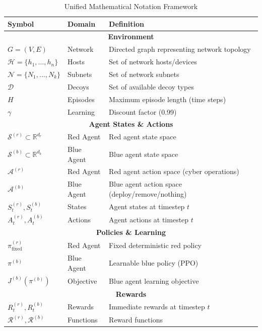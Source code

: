\documentclass[12pt,oneside]{article}
\begin{document}
\begin{table}[h]
\centering
\caption{Unified Mathematical Notation Framework}
\label{tab:unified_notation}
\small
\begin{tabular}{|l|l|p{6cm}|}
\hline
\textbf{Symbol} & \textbf{Domain} & \textbf{Definition} \\
\hline
\multicolumn{3}{|c|}{\textbf{Environment}} \\
\hline
$G = (V, E)$ & Network & Directed graph representing network topology \\
$\mathcal{H} = \{h_1, \ldots, h_n\}$ & Hosts & Set of network hosts/devices \\
$\mathcal{N} = \{N_1, \ldots, N_k\}$ & Subnets & Set of network subnets \\
$\mathcal{D}$ & Decoys & Set of available decoy types \\
$H$ & Episodes & Maximum episode length (time steps) \\
$\gamma$ & Learning & Discount factor (0.99) \\
\hline
\multicolumn{3}{|c|}{\textbf{Agent States \& Actions}} \\
\hline
$\mathcal{S}^{(r)} \subset \mathbb{R}^{d_r}$ & Red Agent & Red agent state space \\
$\mathcal{S}^{(b)} \subset \mathbb{R}^{d_b}$ & Blue Agent & Blue agent state space \\
$\mathcal{A}^{(r)}$ & Red Agent & Red agent action space (cyber operations) \\
$\mathcal{A}^{(b)}$ & Blue Agent & Blue agent action space (deploy/remove/nothing) \\
$S_t^{(r)}, S_t^{(b)}$ & States & Agent states at timestep $t$ \\
$A_t^{(r)}, A_t^{(b)}$ & Actions & Agent actions at timestep $t$ \\
\hline
\multicolumn{3}{|c|}{\textbf{Policies \& Learning}} \\
\hline
$\pi^{(r)}_{\text{fixed}}$ & Red Agent & Fixed deterministic red policy \\
$\pi^{(b)}$ & Blue Agent & Learnable blue policy (PPO) \\
$J^{(b)}(\pi^{(b)})$ & Objective & Blue agent learning objective \\
\hline
\multicolumn{3}{|c|}{\textbf{Rewards}} \\
\hline
$R_t^{(r)}, R_t^{(b)}$ & Rewards & Immediate rewards at timestep $t$ \\
$\mathcal{R}^{(r)}, \mathcal{R}^{(b)}$ & Functions & Reward functions \\
\hline
\end{tabular}
\end{table}
\end{document}
